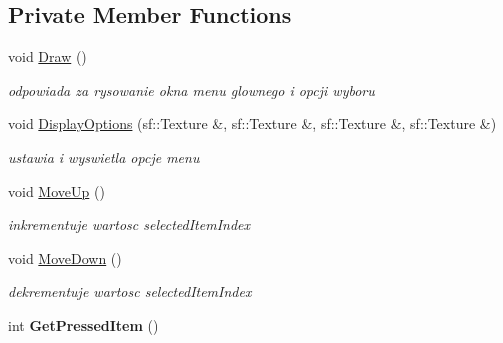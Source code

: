\subsection*{Private Member Functions}
\begin{DoxyCompactItemize}
\item 
\mbox{\label{class_menu_aea20febfb2bcda09545a377b40f806fd}} 
void \mbox{\hyperlink{class_menu_aea20febfb2bcda09545a377b40f806fd}{Draw}} ()
\begin{DoxyCompactList}\small\item\em odpowiada za rysowanie okna menu glownego i opcji wyboru \end{DoxyCompactList}\item 
void \mbox{\hyperlink{class_menu_afc65d89e9644e3b7b6eb18a59392b666}{Display\+Options}} (sf\+::\+Texture \&, sf\+::\+Texture \&, sf\+::\+Texture \&, sf\+::\+Texture \&)
\begin{DoxyCompactList}\small\item\em ustawia i wyswietla opcje menu \end{DoxyCompactList}\item 
\mbox{\label{class_menu_acfb038bbd1050d6c55c86eec1f35dbdb}} 
void \mbox{\hyperlink{class_menu_acfb038bbd1050d6c55c86eec1f35dbdb}{Move\+Up}} ()
\begin{DoxyCompactList}\small\item\em inkrementuje wartosc selected\+Item\+Index \end{DoxyCompactList}\item 
\mbox{\label{class_menu_a804da9a381bb6c633d5d2bc4f839ec62}} 
void \mbox{\hyperlink{class_menu_a804da9a381bb6c633d5d2bc4f839ec62}{Move\+Down}} ()
\begin{DoxyCompactList}\small\item\em dekrementuje wartosc selected\+Item\+Index \end{DoxyCompactList}\item 
\mbox{\label{class_menu_a81b2029bf7783f38be26000969e99e30}} 
int {\bfseries Get\+Pressed\+Item} ()
\end{DoxyCompactItemize}
